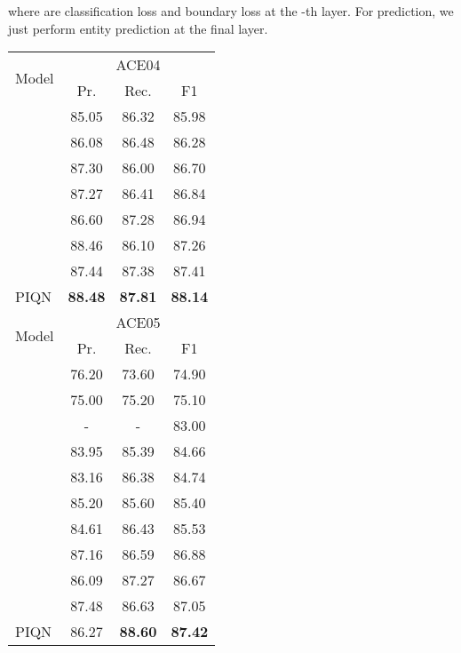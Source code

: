 \documentclass[11pt]{article}
\begin{document}
\noindent where  are classification loss and boundary loss at the -th layer. For prediction, we just perform entity prediction at the final layer. 


















\begin{table}[]
\centering
\small
\begin{tabular}{lccc}

\toprule
\multirow{2}{*}{Model}   & \multicolumn{3}{c}{ACE04}  \\
 \cmidrule(lr){2-4} 
& Pr.  & Rec. & F1  \\
\midrule

\citet{li-etal-2020-unified} & 85.05 & 86.32 &  85.98 \\
\citet{wang-etal-2020-pyramid}       & 86.08  & 86.48  & 86.28     \\
\citet{yu-etal-2020-named}       & 87.30  & 86.00  & 86.70     \\
\citet{yan2021bartner}  & 87.27  & 86.41  & 86.84     \\
\citet{yang2022} &  86.60  & 87.28 &  86.94 \\
\citet{tan2021sequencetoset}  & 88.46 &  86.10 &  87.26    \\
\citet{shen2021locateandlabel} & 87.44  & 87.38  & 87.41  \\
\midrule
PIQN & \textbf{88.48} & \textbf{87.81}  & \textbf{88.14}  \\
\toprule
\multirow{2}{*}{Model}   & \multicolumn{3}{c}{ACE05}  \\
 \cmidrule(lr){2-4} 
& Pr.  & Rec. & F1  \\
\midrule

\citet{lin-etal-2019-sequence}       & 76.20  & 73.60 & 74.90  \\
\citet{luo-zhao-2020-bipartite}       & 75.00  & 75.20  & 75.10    \\
\citet{li-etal-2021-span}  & - & - &  83.00\\
\citet{wang-etal-2020-pyramid}       & 83.95  & 85.39  & 84.66     \\
\citet{yan2021bartner}  & 83.16  & 86.38  & 84.74     \\
\citet{yu-etal-2020-named}       & 85.20  & 85.60  & 85.40     \\
\citet{yang2022}  & 84.61 & 86.43 & 85.53     \\
\citet{li-etal-2020-unified} & 87.16 & 86.59 & 86.88 \\
\citet{shen2021locateandlabel} & {86.09}   & {87.27} & {86.67}  \\
\citet{tan2021sequencetoset}  & 87.48  & 86.63  & 87.05     \\
\midrule
PIQN    & 86.27  & \textbf{88.60} & \textbf{87.42}  \\


\end{tabular}
\end{table}
\end{document}
